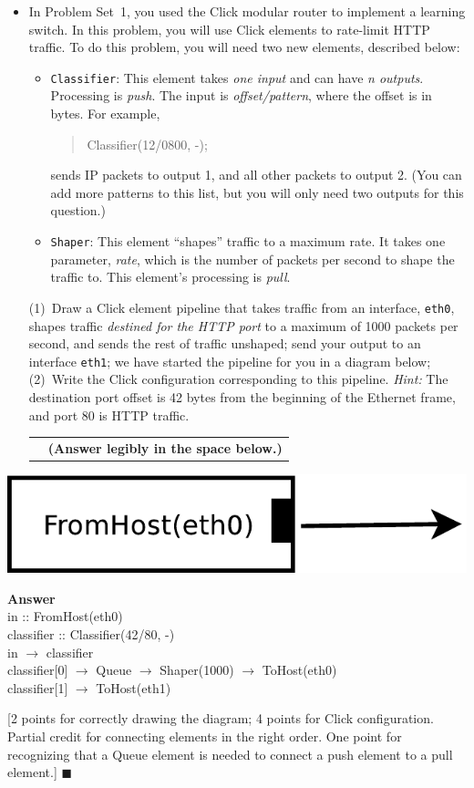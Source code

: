 \documentclass[11pt]{article}
\newcounter{pctr}
\newcommand{\ansbelow}{\probnote{Answer legibly in the space below.}}
\newcommand{\sols}[1]{#1}
\newcommand{\sols}[1]{}
\newcounter{answer}
\newenvironment{answer}[1][\relax]{\refstepcounter{answer}\begin{list}%
 {}{\leftmargin 0pt\rightmargin 0pt\labelsep 3pt\parsep 0pt%
 \setlength{\listparindent}{\parindent}}
    \item {\bf Answer \theanswer #1}\
    }{\hspace*{\fill}$\blacksquare$\end{list}}
\newcommand\prob[1]%
  {\begin{itemize}\item[]%
   \vspace{.2in}{\bf\thepctr. ~[#1~ points]:}\stepcounter{pctr}}
\newcommand\eprob{\end{itemize}}
\newcommand\probnote[1]%
  {\\\begin{tabular}{cr} \hspace{3in} & {\bf (#1)} \\ \end{tabular}}
\begin{document}
\prob{6} In Problem Set~1, you used the Click modular router to
implement a learning switch.  In this problem, you will use Click
elements to rate-limit HTTP traffic.  To do this problem, you will need
two new elements, described below:
\begin{itemize}
\item {\tt Classifier}: This element takes {\em one input} and can have
  {\em n outputs}.  Processing is {\em push}.  The
  input is {\em offset/pattern}, where the offset is in bytes.  For
  example, 
\begin{quote}
Classifier(12/0800,
             -);
\end{quote}
sends IP packets to output 1, and all other packets to output 2.  (You
can add more patterns to this list, but you will only need two outputs
for this question.)
\item {\tt Shaper}: This element ``shapes'' traffic to a maximum rate.
  It takes one parameter, {\em rate}, which is the number of packets per
  second to shape the traffic to. This element's processing is {\em
    pull}. 
\end{itemize}
(1)~Draw a Click element pipeline that takes traffic from an interface,
    {\tt eth0}, shapes traffic {\em destined for the HTTP port} to a
    maximum of 1000 packets per second, and sends the rest of traffic
    unshaped; send your output to an interface {\tt eth1}; we have
    started the pipeline for you in a diagram below; (2)~Write the Click
    configuration corresponding to this pipeline.  {\em Hint:} The
    destination port offset is 42 bytes from the beginning of the
    Ethernet frame, and port 80 is HTTP traffic.~\ansbelow
\eprob

\includegraphics[width=0.3\linewidth]{click}

\vspace{1.25in}

\sols{
\begin{answer}
\\
in :: FromHost(eth0) \\
classifier :: Classifier(42/80, -) \\
in $\rightarrow$ classifier \\
classifier[0] $\rightarrow$ Queue $\rightarrow$ Shaper(1000) $\rightarrow$ ToHost(eth0) \\
classifier[1] $\rightarrow$ ToHost(eth1)


\vspace{0.1in}
[2 points for correctly drawing the diagram; 4 points for Click
  configuration.  Partial credit for connecting elements in the right
  order.  One point for recognizing that a Queue element is needed to
  connect a push element to a pull element.]
\end{answer}
}
\end{document}
